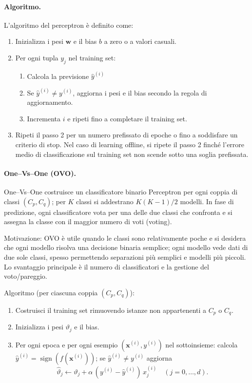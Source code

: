 \paragraph{Algoritmo.}
L'algoritmo del perceptron è definito come:
\begin{enumerate}
  \item Inizializza i pesi $\mathbf{w}$ e il bias $b$ a zero o a valori casuali.
  \item Per ogni tupla $y_j$ nel training set:
  \begin{enumerate}
    \item Calcola la previsione $\hat{y}^{(i)}$
    \item Se $\hat{y}^{(i)}\neq y^{(i)}$, aggiorna i pesi e il bias secondo la regola di aggiornamento.
    \item Incrementa $i$ e ripeti fino a completare il training set.
  \end{enumerate}
  \item Ripeti il passo 2 per un numero prefissato di epoche o fino a soddisfare un criterio di stop. Nel caso di learning offline, si ripete il passo 2 finché l'errore medio di classificazione sul training set non scende sotto una soglia prefissata.
\end{enumerate}

\paragraph{One–Vs–One (OVO).}
One–Vs–One costruisce un classificatore binario Perceptron per ogni coppia di classi $(C_p,C_q)$; per $K$ classi si addestrano $K(K-1)/2$ modelli. In fase di predizione, ogni classificatore vota per una delle due classi che confronta e si assegna la classe con il maggior numero di voti (voting).

Motivazione: OVO è utile quando le classi sono relativamente poche e si desidera che ogni modello risolva una decisione binaria semplice; ogni modello vede dati di due sole classi, spesso permettendo separazioni più semplici e modelli più piccoli. Lo svantaggio principale è il numero di classificatori e la gestione del voto/pareggio.

\noindent
Algoritmo (per ciascuna coppia $(C_p,C_q)$):
\begin{enumerate}
  \item Costruisci il training set rimuovendo istanze non appartenenti a $C_p$ o $C_q$.
  \item Inizializza i pesi $\vartheta_j$ e il bias.
  \item Per ogni epoca e per ogni esempio $(\mathbf{x}^{(i)},y^{(i)})$ nel sottoinsieme: calcola $\hat{y}^{(i)}=\operatorname{sign}(f(\mathbf{x}^{(i)}))$; se $\hat{y}^{(i)}\neq y^{(i)}$ aggiorna
  \[\hat{\vartheta}_j\leftarrow\vartheta_j+\alpha\,(y^{(i)}-\hat{y}^{(i)})\,x_j^{(i)}\quad(j=0,\dots,d).\]
\end{enumerate}

